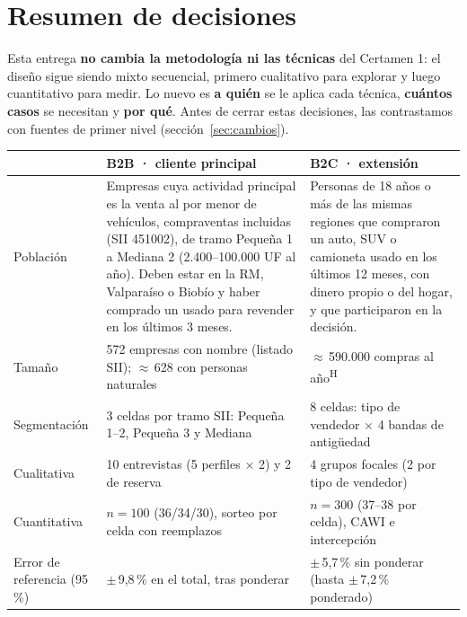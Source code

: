 \documentclass[11pt,a4paper]{article}
\newcommand{\hyp}{\textsuperscript{\textsf{\scriptsize H}}}
\begin{document}
\section*{Resumen de decisiones}

Esta entrega \textbf{no cambia la metodología ni las técnicas} del Certamen 1: el diseño sigue siendo mixto secuencial, primero cualitativo para explorar y luego cuantitativo para medir. Lo nuevo es \textbf{a quién} se le aplica cada técnica, \textbf{cuántos casos} se necesitan y \textbf{por qué}. Antes de cerrar estas decisiones, las contrastamos con fuentes de primer nivel (sección~\ref{sec:cambios}).

\begin{center}\small
\begin{tabularx}{\textwidth}{@{}p{2.6cm}LL@{}}
\toprule
 & \textbf{B2B · cliente principal} & \textbf{B2C · extensión} \\
\midrule
Población & Empresas cuya actividad principal es la venta al por menor de vehículos, compraventas incluidas (SII 451002), de tramo Pequeña 1 a Mediana 2 (2.400–100.000 UF al año). Deben estar en la RM, Valparaíso o Biobío y haber comprado un usado para revender en los últimos 3 meses. & Personas de 18 años o más de las mismas regiones que compraron un auto, SUV o camioneta usado en los últimos 12 meses, con dinero propio o del hogar, y que participaron en la decisión. \\
Tamaño & 572 empresas con nombre (listado SII); $\approx$\,628 con personas naturales & $\approx$\,590.000 compras al año\hyp \\
Segmentación & 3 celdas por tramo SII: Pequeña 1–2, Pequeña 3 y Mediana & 8 celdas: tipo de vendedor $\times$ 4 bandas de antigüedad \\
Cualitativa & 10 entrevistas (5 perfiles $\times$ 2) y 2 de reserva & 4 grupos focales (2 por tipo de vendedor) \\
Cuantitativa & $n=100$ (36/34/30), sorteo por celda con reemplazos & $n=300$ (37–38 por celda), CAWI e intercepción \\
Error de referencia (95\,\%) & $\pm$\,9,8\,\% en el total, tras ponderar & $\pm$\,5,7\,\% sin ponderar (hasta $\pm$\,7,2\,\% ponderado) \\
\bottomrule
\end{tabularx}
\end{center}
\end{document}
